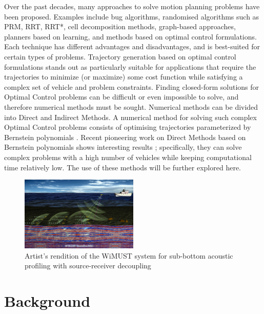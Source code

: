 \par Over the past decades, many approaches to solve motion planning problems have been proposed. Examples include bug algorithms, randomised algorithms such as PRM, RRT, RRT*, cell decomposition methods, graph-based approaches, planners based on learning, and methods based on optimal control formulations. Each technique has different advantages and disadvantages, and is best-suited for certain types of problems. Trajectory generation based on optimal control formulations stands out as particularly suitable for applications that require the trajectories to minimize (or maximize) some cost function while satisfying a complex set of vehicle and problem constraints. Finding closed-form solutions for Optimal Control problems can be difficult or even impossible to solve, and therefore numerical methods must be sought. Numerical methods can be divided into Direct and Indirect Methods. A numerical method for solving such complex Optimal Control problems consists of optimising trajectories parameterized by Bernstein polynomials \cite{lorentz2013bernstein}. Recent pioneering work on Direct Methods based on Bernstein polynomials shows interesting results \cite{cichella2018bernstein}; specifically, they can solve complex problems with a high number of vehicles while keeping computational time relatively low. The use of these methods will be further explored here.

\begin{figure}[h!]
    \centering
    \includegraphics[width=0.5\textwidth]{Images/projects/WiMUST_project.jpg}
    \caption{Artist’s rendition of the WiMUST system for sub-bottom acoustic profiling with source-receiver decoupling}
    \label{fig:WiMUST_System}
\end{figure}


\section{Background}

